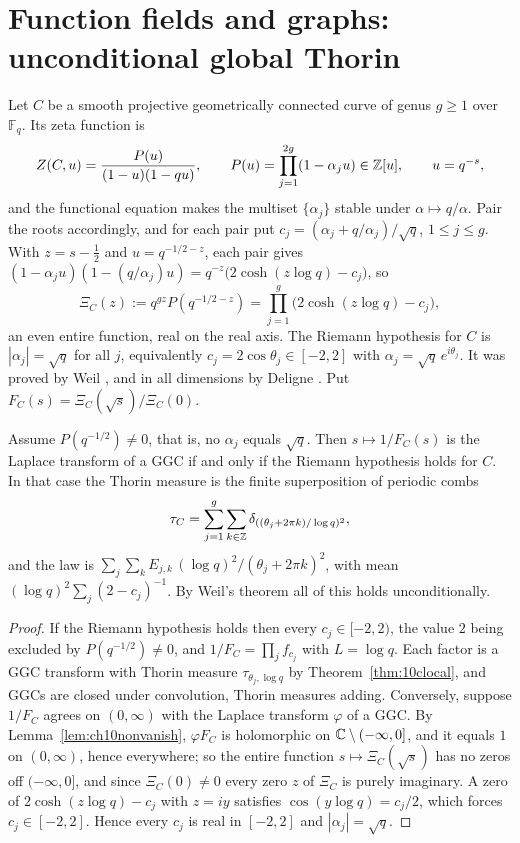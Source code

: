 \section[Function fields and graphs: unconditional global Thorin]{Function fields and graphs:\\ unconditional global Thorin}

Let $C$ be a smooth projective geometrically connected curve of genus $g\ge1$ over $\mathbb F_q$. Its zeta function is
\[
Z(C,u)=\frac{P(u)}{(1-u)(1-qu)},\qquad P(u)=\prod_{j=1}^{2g}(1-\alpha_ju)\in\mathbb{Z}[u],\qquad u=q^{-s},
\]
and the functional equation makes the multiset $\{\alpha_j\}$ stable under $\alpha\mapsto q/\alpha$. Pair the roots accordingly, and for each pair put $c_j=(\alpha_j+q/\alpha_j)/\sqrt q$, $1\le j\le g$. With $z=s-\frac12$ and $u=q^{-1/2-z}$, each pair gives $(1-\alpha_ju)(1-(q/\alpha_j)u)=q^{-z}\bigl(2\cosh(z\log q)-c_j\bigr)$, so
\[
\Xi_C(z):=q^{gz}P(q^{-1/2-z})=\prod_{j=1}^g\bigl(2\cosh(z\log q)-c_j\bigr),
\]
an even entire function, real on the real axis. The Riemann hypothesis for $C$ is $|\alpha_j|=\sqrt q$ for all $j$, equivalently $c_j=2\cos\theta_j\in[-2,2]$ with $\alpha_j=\sqrt q\,e^{i\theta_j}$. It was proved by Weil \cite{weil1948}, and in all dimensions by Deligne \cite{deligne1974}. Put $F_C(s)=\Xi_C(\sqrt s)/\Xi_C(0)$.

\begin{theorem}\label{thm:10ccurve}
Assume $P(q^{-1/2})\ne0$, that is, no $\alpha_j$ equals $\sqrt q$. Then $s\mapsto1/F_C(s)$ is the Laplace transform of a GGC if and only if the Riemann hypothesis holds for $C$. In that case the Thorin measure is the finite superposition of periodic combs
\[
\tau_C=\sum_{j=1}^g\sum_{k\in\mathbb{Z}}\delta_{((\theta_j+2\pi k)/\log q)^2},
\]
and the law is $\sum_j\sum_kE_{j,k}\,(\log q)^2/(\theta_j+2\pi k)^2$, with mean $(\log q)^2\sum_j(2-c_j)^{-1}$. By Weil's theorem all of this holds unconditionally.
\end{theorem}

\begin{proof}
If the Riemann hypothesis holds then every $c_j\in[-2,2)$, the value $2$ being excluded by $P(q^{-1/2})\ne0$, and $1/F_C=\prod_jf_{c_j}$ with $L=\log q$. Each factor is a GGC transform with Thorin measure $\tau_{\theta_j,\log q}$ by Theorem~\ref{thm:10clocal}, and GGCs are closed under convolution, Thorin measures adding. Conversely, suppose $1/F_C$ agrees on $(0,\infty)$ with the Laplace transform $\varphi$ of a GGC. By Lemma~\ref{lem:ch10nonvanish}, $\varphi F_C$ is holomorphic on $\mathbb{C}\setminus(-\infty,0]$, and it equals $1$ on $(0,\infty)$, hence everywhere; so the entire function $s\mapsto\Xi_C(\sqrt s)$ has no zeros off $(-\infty,0]$, and since $\Xi_C(0)\ne0$ every zero $z$ of $\Xi_C$ is purely imaginary. A zero of $2\cosh(z\log q)-c_j$ with $z=iy$ satisfies $\cos(y\log q)=c_j/2$, which forces $c_j\in[-2,2]$. Hence every $c_j$ is real in $[-2,2]$ and $|\alpha_j|=\sqrt q$.
\end{proof}

